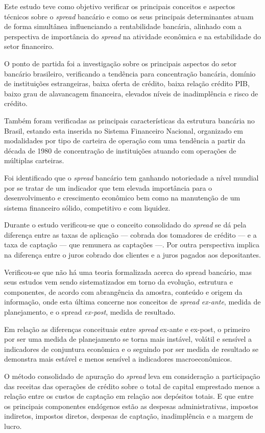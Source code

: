 \documentclass[
  12pt,
  12pt,
  openright,
  oneside,
  a4paper,
  chapter=TITLE,
  section=TITLE,
  subsection=TITLE,
  subsubsection=TITLE,
  portugues,
  sumario=tradicional]{abntex2}
\begin{document}
Este estudo teve como objetivo verificar os principais conceitos e aspectos técnicos sobre o \emph{spread} bancário e como os seus principais determinantes atuam de forma simultânea influenciando a rentabilidade bancária, alinhado com a perspectiva de importância do \emph{spread} na atividade econômica e na estabilidade do setor financeiro.

O ponto de partida foi a investigação sobre os principais aspectos do setor bancário brasileiro, verificando a tendência para concentração bancária, domínio de instituições estrangeiras, baixa oferta de crédito, baixa relação crédito PIB, baixo grau de alavancagem financeira, elevados níveis de inadimplência e risco de crédito.

Também foram verificadas as principais características da estrutura bancária no Brasil, estando esta inserida no Sistema Financeiro Nacional, organizado em modalidades por tipo de carteira de operação com uma tendência a partir da década de 1980 de concentração de instituições atuando com operações de múltiplas carteiras.

Foi identificado que o \emph{spread} bancário tem ganhando notoriedade a nível mundial por se tratar de um indicador que tem elevada importância para o desenvolvimento e crescimento econômico bem como na manutenção de um sistema financeiro sólido, competitivo e com liquidez.

Durante o estudo verificou-se que o conceito consolidado do \emph{spread} se dá pela diferença entre as taxas de aplicação --- cobrada dos tomadores de crédito --- e a taxa de captação --- que remunera as captações ---. Por outra perspectiva implica na diferença entre o juros cobrado dos clientes e a juros pagados aos depositantes.

Verificou-se que não há uma teoria formalizada acerca do spread bancário, mas seus estudos vem sendo sistematizados em torno da evolução, estrutura e componentes, de acordo com abrangência da amostra, conteúdo e origem da informação, onde esta última concerne nos conceitos de \emph{spread ex-ante}, medida de planejamento, e o spread \emph{ex-post}, medida de resultado.

Em relação as diferenças conceituais entre \emph{spread} ex-ante e ex-post, o primeiro por ser uma medida de planejamento se torna mais instável, volátil e sensível a indicadores de conjuntura econômica e o seguindo por ser medida de resultado se demonstra mais estável e menos sensível a indicadores macroeconômicos.

O método consolidado de apuração do \emph{spread} leva em consideração a participação das receitas das operações de crédito sobre o total de capital emprestado menos a relação entre os custos de captação em relação aos depósitos totais. E que entre os principais componentes endógenos estão as despesas administrativas, impostos indiretos, impostos diretos, despesas de captação, inadimplência e a margem de lucro.
\end{document}

